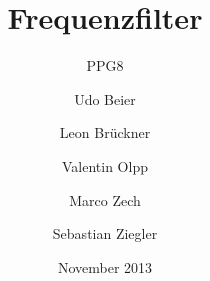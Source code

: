 


\title{Frequenzfilter}
\subtitle{PPG8}
\date{November 2013}
\author{Udo Beier \and Leon Brückner \and Valentin Olpp \and Marco Zech \and Sebastian Ziegler}
\maketitle
\tableofcontents
\listoffigures
\newpage




\newpage




